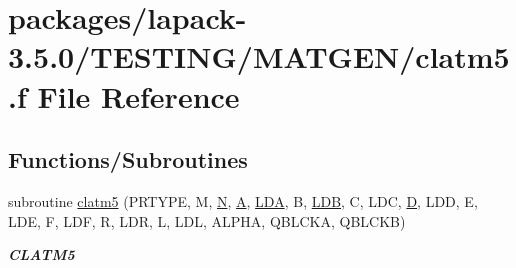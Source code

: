 \hypertarget{clatm5_8f}{}\section{packages/lapack-\/3.5.0/\+T\+E\+S\+T\+I\+N\+G/\+M\+A\+T\+G\+E\+N/clatm5.f File Reference}
\label{clatm5_8f}
\subsection*{Functions/\+Subroutines}
\begin{DoxyCompactItemize}
\item 
subroutine \hyperlink{group__complex__matgen_ga6b05f57659c673fb19b320ad9737810b}{clatm5} (P\+R\+T\+Y\+P\+E, M, \hyperlink{polmisc_8c_a0240ac851181b84ac374872dc5434ee4}{N}, \hyperlink{classA}{A}, \hyperlink{example__user_8c_ae946da542ce0db94dced19b2ecefd1aa}{L\+D\+A}, B, \hyperlink{example__user_8c_a50e90a7104df172b5a89a06c47fcca04}{L\+D\+B}, C, L\+D\+C, \hyperlink{odrpack_8h_a7dae6ea403d00f3687f24a874e67d139}{D}, L\+D\+D, E, L\+D\+E, F, L\+D\+F, R, L\+D\+R, L, L\+D\+L, A\+L\+P\+H\+A, Q\+B\+L\+C\+K\+A, Q\+B\+L\+C\+K\+B)
\begin{DoxyCompactList}\small\item\em {\bfseries C\+L\+A\+T\+M5} \end{DoxyCompactList}\end{DoxyCompactItemize}
